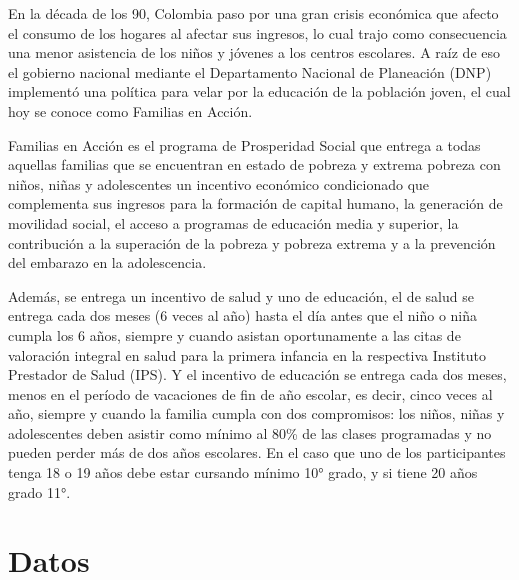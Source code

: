 \documentclass[AER]{AEA}
\begin{document}
En la década de los 90, Colombia paso por una gran crisis económica que afecto el consumo de los hogares al afectar sus ingresos, lo cual trajo como consecuencia una menor asistencia de los niños y jóvenes a los centros escolares. A raíz de eso el gobierno nacional mediante el Departamento Nacional de Planeación (DNP) implementó una política para velar por la educación de la población joven, el cual hoy se conoce como Familias en Acción.

Familias en Acción es el programa de Prosperidad Social que entrega a todas aquellas familias que se encuentran en estado de pobreza y extrema pobreza con niños, niñas y adolescentes un incentivo económico condicionado que complementa sus ingresos para la formación de capital humano, la generación de movilidad social, el acceso a programas de educación media y superior, la contribución a la superación de la pobreza y pobreza extrema y a la prevención del embarazo en la adolescencia. 

Además, se entrega un incentivo de salud y uno de educación, el de salud se entrega cada dos meses (6 veces al año) hasta el día antes que el niño o niña cumpla los 6 años, siempre y cuando asistan oportunamente a las citas de valoración integral en salud para la primera infancia en la respectiva Instituto Prestador de Salud (IPS). Y el incentivo de educación se entrega cada dos meses, menos en el período de vacaciones de fin de año escolar, es decir, cinco veces al año, siempre y cuando la familia cumpla con dos compromisos: los niños, niñas y adolescentes deben asistir como mínimo al 80\% de las clases programadas y no pueden perder más de dos años escolares. En el caso que uno de los participantes tenga 18 o 19 años debe estar cursando mínimo 10° grado, y si tiene 20 años grado 11°.


\section{Datos}

\end{document}
